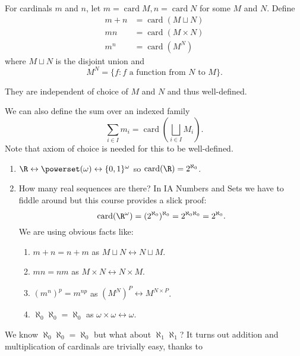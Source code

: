 \documentclass[a4paper]{article}
\DeclareMathOperator{\card}{card}
\newcommand*{\biject}{\leftrightarrow}
\begin{document}
\begin{definition}
  For cardinals \(m\) and \(n\), let \(m = \card M, n = \card N\) for some \(M\) and \(N\). Define
  \begin{align*}
    m + n &= \card(M \sqcup N) \\
    mn &= \card(M \times N) \\
    m^n &= \card(M^N)
  \end{align*}
  where \(M \sqcup N\) is the disjoint union and
  \[
    M^N = \{f: f \text{ a function from } N \text{ to } M\}.
  \]
\end{definition}

\begin{note}
  They are independent of choice of \(M\) and \(N\) and thus well-defined.
\end{note}

We can also define the sum over an indexed family
\[
  \sum_{i \in I} m_i = \card( \bigsqcup_{i \in I} M_i).
\]
Note that axiom of choice is needed for this to be well-defined.

\begin{eg}\leavevmode
  \begin{enumerate}
  \item \(\R \biject \powerset(\omega) \biject \{0, 1\}^\omega\) so \(\card(\R) = 2^{\aleph_0}\).
  \item How many real sequences are there? In IA Numbers and Sets we have to fiddle around but this course provides a slick proof:
    \[
      \card(\R^\omega) = (2^{\aleph_0})^{\aleph_0} = 2^{\aleph_0 \aleph_0} = 2^{\aleph_0}.
    \]
    We are using obvious facts like:
    \begin{enumerate}
    \item \(m + n = n + m\) as \(M \sqcup N \biject N \sqcup M\).
    \item \(mn = nm\) as \(M \times N \biject N \times M\).
    \item \((m^n)^p = m^{np}\) as \((M^N)^P \biject M^{N \times P}\).
    \item \(\aleph_0 \aleph_0 = \aleph_0\) as \(\omega \times \omega \biject \omega\).
    \end{enumerate}
  \end{enumerate}
\end{eg}

We know \(\aleph_0 \aleph_0 = \aleph_0\) but what about \(\aleph_1 \aleph_1\)? It turns out addition and multiplication of cardinals are trivially easy, thanks to
\end{document}
